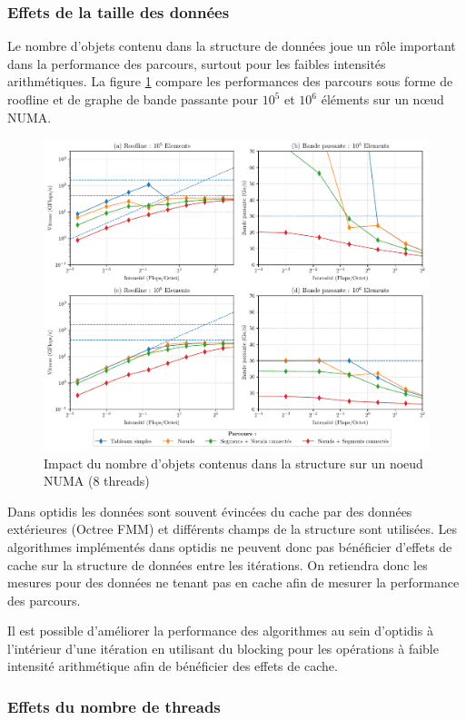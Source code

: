 \subsubsection{Effets de la taille des données}

Le nombre d'objets contenu dans la structure de données joue un rôle important dans la performance des parcours, surtout pour les faibles intensités arithmétiques. La figure \ref{fig:bench_mesh_effet_taille} compare les performances des parcours sous forme de roofline et de graphe de bande passante pour $10^5$ et $10^6$ éléments sur un nœud NUMA.

\begin{figure}
    \centering
    \includegraphics[width=.8\textwidth]{img/bench_mesh_omp_effet_taille.pdf}
    \caption{Impact du nombre d'objets contenus dans la structure sur un noeud NUMA (8 threads)}
    \label{fig:bench_mesh_effet_taille}
\end{figure}

Dans optidis les données sont souvent évincées du cache par des données extérieures (Octree FMM) et différents champs de la structure sont utilisées. Les algorithmes implémentés dans optidis ne peuvent donc pas bénéficier d'effets de cache sur la structure de données entre les itérations. On retiendra donc les mesures pour des données ne tenant pas en cache afin de mesurer la performance des parcours.

Il est possible d'améliorer la performance des algorithmes au sein d'optidis à l'intérieur d'une itération en utilisant du blocking pour les opérations à faible intensité arithmétique afin de bénéficier des effets de cache. 

\subsubsection{Effets du nombre de threads}

